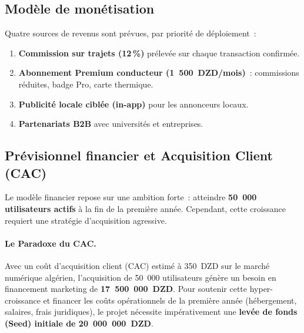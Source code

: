 \subsection{Modèle de monétisation}

Quatre sources de revenus sont prévues, par priorité de déploiement~:
\begin{enumerate}
  \item \textbf{Commission sur trajets (12\,\%)} prélevée sur chaque transaction confirmée.
  \item \textbf{Abonnement Premium conducteur (1~500~DZD/mois)}~: commissions réduites, badge Pro, carte thermique.
  \item \textbf{Publicité locale ciblée (in-app)} pour les annonceurs locaux.
  \item \textbf{Partenariats B2B} avec universités et entreprises.
\end{enumerate}

\subsection{Prévisionnel financier et Acquisition Client (CAC)}

Le modèle financier repose sur une ambition forte~: atteindre \textbf{50~000 utilisateurs actifs} à la fin de la première année. Cependant, cette croissance requiert une stratégie d'acquisition agressive. 

\paragraph{Le Paradoxe du CAC.} Avec un coût d'acquisition client (CAC) estimé à 350~DZD sur le marché numérique algérien, l'acquisition de 50~000 utilisateurs génère un besoin en financement marketing de \textbf{17~500~000~DZD}. Pour soutenir cette hyper-croissance et financer les coûts opérationnels de la première année (hébergement, salaires, frais juridiques), le projet nécessite impérativement une \textbf{levée de fonds (Seed) initiale de 20~000~000~DZD}.


